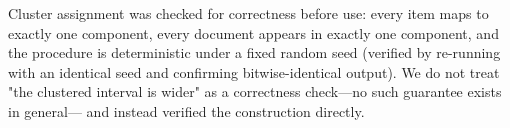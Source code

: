 Cluster assignment was checked for correctness before use: every item maps to exactly one component,
every document appears in exactly one component, and the procedure is deterministic under a fixed
random seed (verified by re-running with an identical seed and confirming bitwise-identical output).
We do not treat "the clustered interval is wider" as a correctness check---no such guarantee exists
in general--- and instead verified the construction directly.
